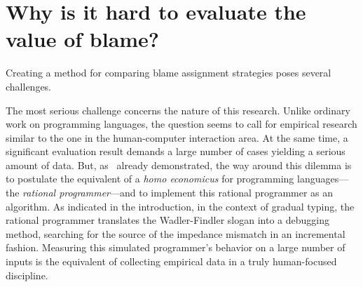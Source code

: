 
\section{Why is it hard to evaluate the value of blame?}

Creating a method for comparing blame assignment strategies poses several
challenges.




The most serious challenge concerns the nature of this research. Unlike ordinary
work on programming languages, the question seems to call for empirical research
similar to the one in the human-computer interaction area. At the same time, a
significant evaluation result demands a large number of cases yielding a serious
amount of data. But, as~\citet{lksfd-popl-2020} already demonstrated, the way
around this dilemma is to postulate the equivalent of a {\it homo economicus\/}
for programming languages---the {\em rational programmer\/}---and to implement
this rational programmer as an algorithm.  As indicated in the introduction, in
the context of gradual typing, the rational programmer translates the
Wadler-Findler slogan into a debugging method, searching for the source of the
impedance mismatch in an incremental fashion. Measuring this simulated
programmer's behavior on a large number of inputs is the equivalent of
collecting empirical data in a truly human-focused discipline. 


